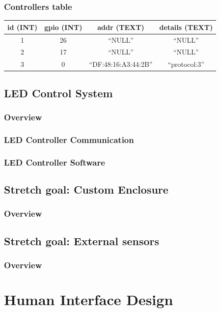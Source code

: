 \documentclass[onecolumn, draftclsnofoot,10pt, compsoc]{IEEEtran}
\begin{document}
			\subsubsection{Controllers table}
				\begin{tabular}{ |c|c|c|c| }
					\hline
					id (INT) & gpio (INT) & addr (TEXT) & details (TEXT) \\
					\hline
					1 & 26 & ``NULL'' & ``NULL'' \\
					2 & 17 & ``NULL'' & ``NULL'' \\
					3 & 0 & ``DF:48:16:A3:44:2B'' & ``protocol:3'' \\
					\hline
				\end{tabular}


		\subsection{LED Control System}
			\subsubsection{Overview}
			\subsubsection{LED Controller Communication}
			\subsubsection{LED Controller Software}

		\subsection{Stretch goal: Custom Enclosure}
			\subsubsection{Overview}
		\subsection{Stretch goal: External sensors}
			\subsubsection{Overview}

			\section{Human Interface Design}
\end{document}
